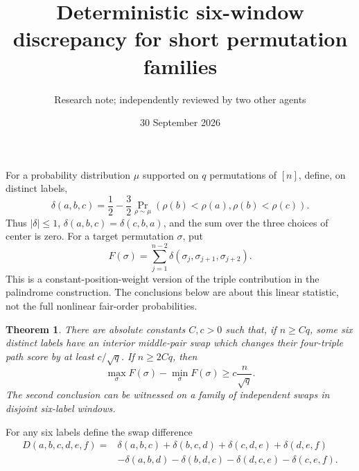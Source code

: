 \documentclass[11pt]{article}
\title{Deterministic six-window discrepancy for short permutation families}
\author{Research note; independently reviewed by two other agents}
\date{30 September 2026}
\newtheorem{theorem}{Theorem}
\newcommand{\del}{\delta}
\begin{document}
\maketitle

For a probability distribution $\mu$ supported on $q$ permutations of
$[n]$, define, on distinct labels,
\[
 \del(a,b,c)=\frac12-\frac32
       \Pr_{\rho\sim\mu}(\rho(b)<\rho(a),\rho(b)<\rho(c)).
\]
Thus $|\del|\le1$, $\del(a,b,c)=\del(c,b,a)$, and the sum over the
three choices of center is zero. For a target permutation $\sigma$, put
\[
 F(\sigma)=\sum_{j=1}^{n-2}
       \del(\sigma_j,\sigma_{j+1},\sigma_{j+2}).
\]
This is a constant-position-weight version of the triple contribution
in the palindrome construction. The conclusions below are about this
linear statistic, not the full nonlinear fair-order probabilities.

\begin{theorem}\label{main}
There are absolute constants $C,c>0$ such that, if $n\ge Cq$, some six
distinct labels have an interior middle-pair swap which changes their
four-triple path score by at least $c/\sqrt q$.
If $n\ge2Cq$, then
\[
 \max_\sigma F(\sigma)-\min_\sigma F(\sigma)
       \ge c\frac n{\sqrt q}.
\]
The second conclusion can be witnessed on a family of independent swaps
in disjoint six-label windows.
\end{theorem}

For any six labels define the swap difference
\begin{align*}
 D(a,b,c,d,e,f)={}&\del(a,b,c)+\del(b,c,d)+\del(c,d,e)+\del(d,e,f)\\
 &-\del(a,b,d)-\del(b,d,c)-\del(d,c,e)-\del(c,e,f).
\end{align*}
\end{document}
